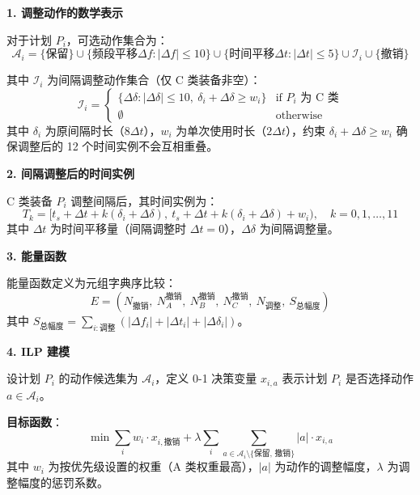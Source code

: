 
\textbf{1. 调整动作的数学表示}

对于计划 $P_i$，可选动作集合为：
\begin{equation}
    \mathcal{A}_i = \{\text{保留}\} \cup \{\text{频段平移} \Delta f : |\Delta f| \leq 10\} \cup \{\text{时间平移} \Delta t : |\Delta t| \leq 5\} \cup \mathcal{I}_i \cup \{\text{撤销}\}
\end{equation}

其中 $\mathcal{I}_i$ 为间隔调整动作集合（仅 C 类装备非空）：
\begin{equation}
    \mathcal{I}_i = \begin{cases}
        \{\Delta \delta : |\Delta \delta| \leq 10,\ \delta_i + \Delta \delta \geq w_i\} & \text{if } P_i \text{ 为 C 类} \\
        \emptyset & \text{otherwise}
    \end{cases}
\end{equation}
其中 $\delta_i$ 为原间隔时长（$8\Delta t$），$w_i$ 为单次使用时长（$2\Delta t$），约束 $\delta_i + \Delta \delta \geq w_i$ 确保调整后的 12 个时间实例不会互相重叠。

\textbf{2. 间隔调整后的时间实例}

C 类装备 $P_i$ 调整间隔后，其时间实例为：
\begin{equation}
    T_k = [t_s + \Delta t + k(\delta_i + \Delta \delta),\ t_s + \Delta t + k(\delta_i + \Delta \delta) + w_i),\quad k = 0, 1, \ldots, 11
\end{equation}
其中 $\Delta t$ 为时间平移量（间隔调整时 $\Delta t = 0$），$\Delta \delta$ 为间隔调整量。

\textbf{3. 能量函数}

能量函数定义为元组字典序比较：
\begin{equation}
    E = (N_{\text{撤销}},\ N_A^{\text{撤销}},\ N_B^{\text{撤销}},\ N_C^{\text{撤销}},\ N_{\text{调整}},\ S_{\text{总幅度}})
\end{equation}
其中 $S_{\text{总幅度}} = \sum_{i: \text{调整}} (|\Delta f_i| + |\Delta t_i| + |\Delta \delta_i|)$。

\textbf{4. ILP 建模}

设计划 $P_i$ 的动作候选集为 $\mathcal{A}_i$，定义 0-1 决策变量 $x_{i,a}$ 表示计划 $P_i$ 是否选择动作 $a \in \mathcal{A}_i$。

\textbf{目标函数}：
\begin{equation}
    \min \sum_{i} w_i \cdot x_{i,\text{撤销}} + \lambda \sum_{i} \sum_{a \in \mathcal{A}_i \setminus \{\text{保留, 撤销}\}} |a| \cdot x_{i,a}
\end{equation}
其中 $w_i$ 为按优先级设置的权重（A 类权重最高），$|a|$ 为动作的调整幅度，$\lambda$ 为调整幅度的惩罚系数。

